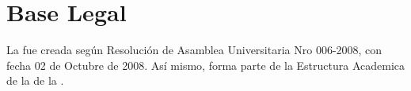 \section{Base Legal}
La \SchoolFullName fue creada según Resolución de Asamblea Universitaria Nro 006-2008, con fecha 02 de Octubre de 2008.
Así­ mismo, forma parte de la Estructura Academica de la \FacultadName de la \University.
